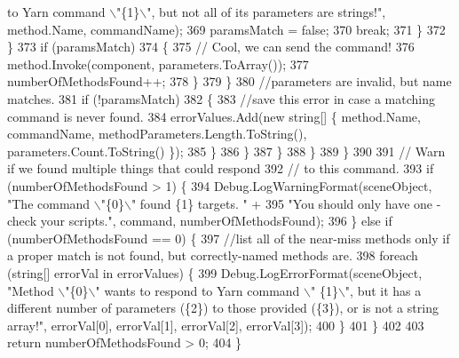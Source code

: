 \begin{DoxyCode}
{       to Yarn command \(\backslash\)"\{1\}\(\backslash\)", but not all of its parameters are strings!"}, method.Name, commandName);
369                                         paramsMatch = \textcolor{keyword}{false};
370                                         \textcolor{keywordflow}{break};
371                                     \}
372                                 \}
373                                 \textcolor{keywordflow}{if} (paramsMatch)
374                                 \{
375                                     \textcolor{comment}{// Cool, we can send the command!}
376                                     method.Invoke(component, parameters.ToArray());
377                                     numberOfMethodsFound++;
378                                 \}
379                             \}
380                             \textcolor{comment}{//parameters are invalid, but name matches.}
381                             \textcolor{keywordflow}{if} (!paramsMatch)
382                             \{
383                                 \textcolor{comment}{//save this error in case a matching command is never found.}
384                                 errorValues.Add(\textcolor{keyword}{new} \textcolor{keywordtype}{string}[] \{ method.Name, commandName, 
      methodParameters.Length.ToString(), parameters.Count.ToString() \});
385                             \}
386                         \}
387                     \}
388                 \}
389             \}
390 
391             \textcolor{comment}{// Warn if we found multiple things that could respond}
392             \textcolor{comment}{// to this command.}
393             \textcolor{keywordflow}{if} (numberOfMethodsFound > 1) \{
394                 Debug.LogWarningFormat(sceneObject, \textcolor{stringliteral}{"The command \(\backslash\)"\{0\}\(\backslash\)" found \{1\} targets. "} +
395                     \textcolor{stringliteral}{"You should only have one - check your scripts."}, command, numberOfMethodsFound);
396             \} \textcolor{keywordflow}{else} \textcolor{keywordflow}{if} (numberOfMethodsFound == 0) \{
397                 \textcolor{comment}{//list all of the near-miss methods only if a proper match is not found, but
       correctly-named methods are.}
398                 \textcolor{keywordflow}{foreach} (\textcolor{keywordtype}{string}[] errorVal \textcolor{keywordflow}{in} errorValues) \{
399                     Debug.LogErrorFormat(sceneObject, \textcolor{stringliteral}{"Method \(\backslash\)"\{0\}\(\backslash\)" wants to respond to Yarn command \(\backslash\)"
      \{1\}\(\backslash\)", but it has a different number of parameters (\{2\}) to those provided (\{3\}), or is not a string array!"}, 
      errorVal[0], errorVal[1], errorVal[2], errorVal[3]);
400                 \}
401             \}
402 
403             \textcolor{keywordflow}{return} numberOfMethodsFound > 0;
404         \}
\end{DoxyCode}
